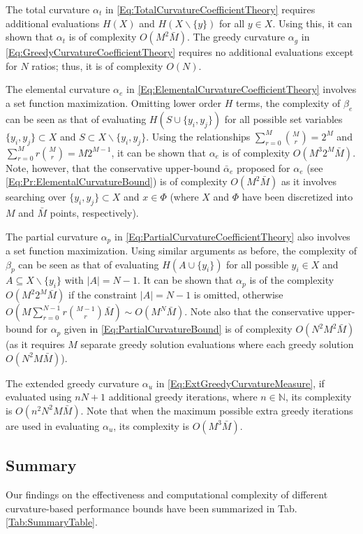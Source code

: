 \documentclass[letterpaper, 10 pt, conference]{ieeeconf}
\newcommand{\N}{\mathbb{N}}
\begin{document}
The total curvature $\alpha_t$ in \eqref{Eq:TotalCurvatureCoefficientTheory} requires additional evaluations $H(X)$ and $H(X\backslash \{y\})$ for all $y\in X$. Using this, it can shown that $\alpha_t$ is of complexity $O(M^2\bar{M})$. The greedy curvature  $\alpha_g$ in \eqref{Eq:GreedyCurvatureCoefficientTheory} requires no additional evaluations except for $N$ ratios; thus, it is of complexity $O(N)$. 

The elemental curvature $\alpha_e$ in \eqref{Eq:ElementalCurvatureCoefficientTheory} involves a set function maximization. Omitting lower order $H$ terms, the complexity of $\beta_e$ can be seen as that of evaluating $H(S\cup\{y_i,y_j\})$ for all possible set variables $\{y_i,y_j\}\subset X$ and $S\subset X\backslash \{y_i,y_j\}$. Using the relationships $\sum_{r=0}^M {M \choose r} = 2^M$ and $\sum_{r=0}^M r {M \choose r} = M2^{M-1}$, it can be shown that $\alpha_e$ is of complexity $O(M^3 2^M \bar{M})$. Note, however, that the conservative upper-bound $\bar{\alpha}_e$ proposed for $\alpha_e$ (see \eqref{Eq:Pr:ElementalCurvatureBound}) is of complexity $O(M^2\bar{M})$ as it involves searching over $\{y_i,y_j\}\subset X$ and $x\in\Phi$ (where $X$ and $\Phi$ have been discretized into $M$ and $\bar{M}$ points, respectively).

The partial curvature $\alpha_p$ in \eqref{Eq:PartialCurvatureCoefficientTheory} also involves a set function maximization. Using similar arguments as before, the complexity of $\beta_p$ can be seen as that of evaluating $H(A\cup \{y_i\})$ for all possible $y_i\in X$ and $A \subseteq X\backslash \{y_i\}$ with $\vert A \vert = N-1$. It can be shown that $\alpha_p$ is of the complexity $O(M^2 2^M \bar{M})$ if the constraint  $\vert A \vert = N-1$ is omitted, otherwise $O(M \sum_{r=0}^{N-1} r{M-1 \choose r}  \bar{M}) \sim O(M^N \bar{M})$. Note also that the conservative upper-bound for $\alpha_p$ given in \eqref{Eq:PartialCurvatureBound} is of complexity $O(N^2 M^2 \bar{M})$ (as it requires $M$ separate greedy solution evaluations where each greedy solution $O(N^2 M \bar{M})$).
      
The extended greedy curvature $\alpha_u$ in \eqref{Eq:ExtGreedyCurvatureMeasure}, if evaluated using $nN+1$ additional greedy iterations, where $n\in \N$, its complexity is $O(n^2N^2M\bar{M})$. Note that when the maximum possible extra greedy iterations are used in evaluating $\alpha_u$, its complexity is $O(M^3\bar{M})$.

\subsection{Summary}
Our findings on the effectiveness and computational complexity of different curvature-based performance bounds have been summarized in Tab. \ref{Tab:SummaryTable}. 
\end{document}
